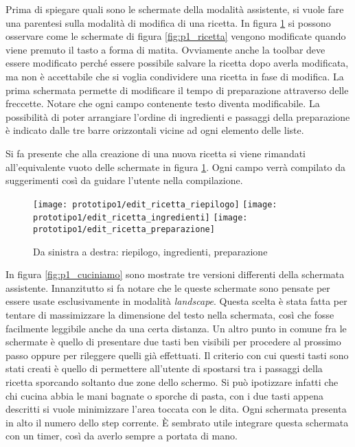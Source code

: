 Prima di spiegare quali sono le schermate della modalità assistente, si vuole fare una parentesi sulla modalità di modifica di una ricetta.
In figura \ref{fig:p1_edit_ricetta} si possono osservare come le schermate di figura \ref{fig:p1_ricetta} vengono modificate quando viene premuto il tasto a forma di matita.
Ovviamente anche la toolbar deve essere modificato perché essere possibile salvare la ricetta dopo averla modificata, ma non è accettabile che si voglia condividere una ricetta in fase di modifica.
La prima schermata permette di modificare il tempo di preparazione attraverso delle freccette.
Notare che ogni campo contenente testo diventa modificabile.
La possibilità di poter arrangiare l'ordine di ingredienti e passaggi della preparazione è indicato dalle tre barre orizzontali vicine ad ogni elemento delle liste.

Si fa presente che alla creazione di una nuova ricetta si viene rimandati all'equivalente vuoto delle schermate in figura \ref{fig:p1_edit_ricetta}.
Ogni campo verrà compilato da suggerimenti così da guidare l'utente nella compilazione.

\begin{figure}[ht]
  \begin{center}
    \texttt{[image: prototipo1/edit\_ricetta\_riepilogo]}
    \texttt{[image: prototipo1/edit\_ricetta\_ingredienti]}
    \texttt{[image: prototipo1/edit\_ricetta\_preparazione]}
    \caption{Da sinistra a destra: riepilogo, ingredienti, preparazione}
    \label{fig:p1_edit_ricetta}
  \end{center}
\end{figure}


In figura \ref{fig:p1_cuciniamo} sono mostrate tre versioni differenti della schermata assistente.
Innanzitutto si fa notare che le queste schermate sono pensate per essere usate esclusivamente in modalità \textit{landscape}.
Questa scelta è stata fatta per tentare di massimizzare la dimensione del testo nella schermata, così che fosse facilmente leggibile anche da una certa distanza.
Un altro punto in comune fra le schermate è quello di presentare due tasti ben visibili per procedere al prossimo passo oppure per rileggere quelli già effettuati.
Il criterio con cui questi tasti sono stati creati è quello di permettere all'utente di spostarsi tra i passaggi della ricetta sporcando soltanto due zone dello schermo.
Si può ipotizzare infatti che chi cucina abbia le mani bagnate o sporche di pasta, con i due tasti appena descritti si vuole minimizzare l'area toccata con le dita.
Ogni schermata presenta in alto il numero dello step corrente.
È sembrato utile integrare questa schermata con un timer, così da averlo sempre a portata di mano.

